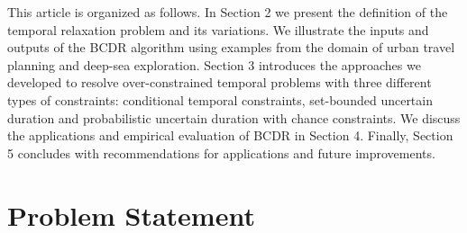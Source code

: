\documentclass[jair,twoside,11pt,theapa]{article}
\begin{document}
%


This article is organized as follows. In Section 2 we present the definition of
the temporal relaxation problem and its variations. We illustrate the inputs and
outputs of the BCDR algorithm using examples from the domain of urban travel
planning and deep-sea exploration. Section 3 introduces the approaches we
developed to resolve over-constrained temporal problems with three different
types of constraints: conditional temporal constraints, set-bounded uncertain
duration and probabilistic uncertain duration with chance constraints. We
discuss the applications and empirical evaluation of BCDR in Section 4. Finally,
Section 5 concludes with recommendations for applications and future
improvements.


%
%
%


\section{Problem Statement}

%
%
%
%
\end{document}
